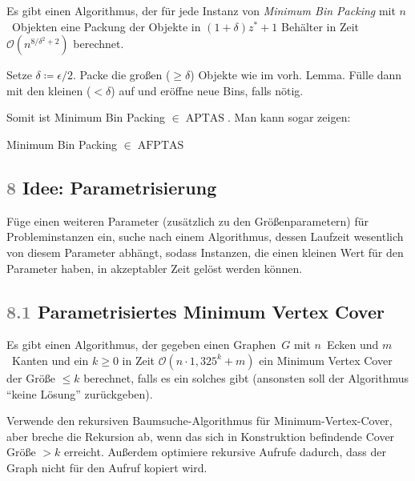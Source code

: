 \documentclass{cheat-sheet}
\DeclareMathOperator{\APTAS}{APTAS} %
\DeclareMathOperator{\AFPTAS}{AFPTAS} %
\renewcommand{\O}{\mathcal{O}} %
\newcommand{\Problem}[1]{\textcolor{ProblemColor}{\textbf{#1}}}
\newcommand{\scriptSection}[1]{\textcolor{gray}{#1}\enspace}
\begin{document}
\begin{satz}
  Es gibt einen Algorithmus, der für jede Instanz von \textit{Minimum Bin Packing} mit $n$~Objekten eine Packung der Objekte in $(1 + \delta) z^* + 1$ Behälter in Zeit $\O(n^{8/\delta^2 + 2})$ berechnet.
\end{satz}

\begin{alg}
  Setze $\delta \coloneqq \epsilon / 2$.
  Packe die großen ($\geq \delta$) Objekte wie im vorh\@. Lemma.
  Fülle dann mit den kleinen ($< \delta$) auf und eröffne neue Bins, falls nötig.
\end{alg}

Somit ist Minimum Bin Packing $\in \APTAS$.
Man kann sogar zeigen:

\begin{resultat}
  Minimum Bin Packing $\in \AFPTAS$
\end{resultat}

\subsection{\scriptSection{8} Idee: Parametrisierung}

\begin{vorgehen}
  Füge einen weiteren Parameter (zusätzlich zu den Größenparametern) für Probleminstanzen ein, suche nach einem Algorithmus, dessen Laufzeit wesentlich von diesem Parameter abhängt, sodass Instanzen, die einen kleinen Wert für den Parameter haben, in akzeptabler Zeit gelöst werden können.
\end{vorgehen}

\subsection{\scriptSection{8.1} Parametrisiertes \Problem{Minimum Vertex Cover}}

\begin{satz}
  Es gibt einen Algorithmus, der gegeben einen Graphen~$G$ mit $n$~Ecken und $m$~Kanten und ein $k \geq 0$ in Zeit $\O(n \cdot 1,325^{k} + m)$ ein Minimum Vertex Cover der Größe $\leq k$ berechnet, falls es ein solches gibt (ansonsten soll der Algorithmus "`keine Lösung"' zurückgeben).
\end{satz}

\begin{idee}
  Verwende den rekursiven Baumsuche-Algorithmus für Minimum-Vertex-Cover, aber breche die Rekursion ab, wenn das sich in Konstruktion befindende Cover Größe $> k$ erreicht.
  Außerdem optimiere rekursive Aufrufe dadurch, dass der Graph nicht für den Aufruf kopiert wird.
\end{idee}
\end{document}
